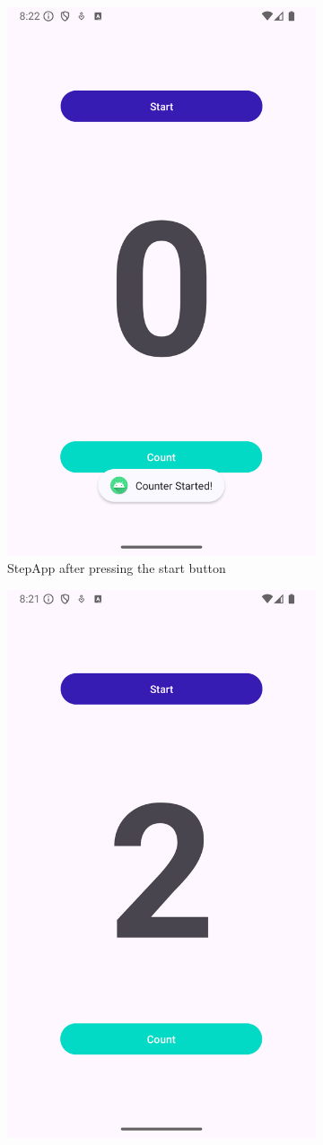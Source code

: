 \documentclass{usireport}
\begin{document}
\begin{figure}[H]
    \centering
    \begin{subfigure}{0.4\textwidth}
        \centering
        \includegraphics[width=0.63\linewidth]{fig/stepapp_start.png}
        \caption{StepApp after pressing the start button}
        \label{fig:stepapp_start}
    \end{subfigure}
    \hspace{1cm}
    \begin{subfigure}{0.4\textwidth}
        \centering
        \includegraphics[width=0.63\linewidth]{fig/stepapp_count.png}

\end{subfigure}
\end{figure}
\end{document}
